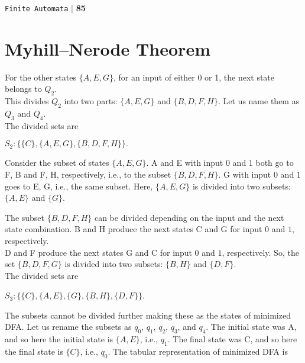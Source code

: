\documentclass[8pt]{beamer}
\begin{document}
\begin{frame}

\begin{flushright}
 \texttt{Finite Automata} \hspace*{0.10cm}\textbf{$|$} \textbf{85}\hspace*{0.5cm}
\end{flushright}

\section*{Myhill–Nerode Theorem}

\vspace*{0.5cm}
For the other states $\{A, E, G\}$, for an input of either 0 or 1, the next state belongs to $Q_2$.\\
This divides $Q_2$ into two parts: $\{A, E, G\}$ and $\{B, D, F, H\}$. Let us name them as $Q_3$ and $Q_4$.\\
The divided sets are\\

\vspace*{0.3cm}
\pause
\begin{center}
  $S_2: \{\{C\}, \{A, E, G\}, \{B, D, F, H\}\}.$ \\
\end{center}

\pause
Consider the subset of states $\{A, E, G\}$. A and E with input 0 and 1 both go to F, B and F, H, respectively,
i.e., to the subset $\{B, D, F, H\}$. G with input $0$ and $1$ goes to E, G, i.e., the same subset. Here, $\{A, E, G\}$
is divided into two subsets: $\{A, E\}$ and $\{G\}$.\\
\end{frame}

\begin{frame}
\hspace*{0.4cm} The subset $\{B, D, F, H\}$ can be divided depending on the input and the next state combination. B and
H produce the next states C and G for input $0$ and $1$, respectively.\\
\hspace*{0.4cm} D and F produce the next states G and C for input $0$ and $1$, respectively. So, the set $\{B, D, F, G\}$ is
divided into two subsets: $\{B, H\}$ and $\{D, F\}$.\\
\hspace*{0.4cm} The divided sets are\\

\vspace*{0.3cm}
\pause
\begin{center}
  $S_3: \{\{C\}, \{A, E\}, \{G\}, \{B, H\}, \{D, F\}\} $. \\
\end{center}

\pause
The subsets cannot be divided further making these as the states of minimized DFA. Let us rename the
subsets as $q_0$, $q_1$, $q_2$, $q_3$, and $q_4$. The initial state was A, and so here the initial state is $\{A, E\}$, i.e., $q_1$. The
final state was C, and so here the final state is $\{C\}$, i.e., $q_0$. The tabular representation of minimized DFA is\\
\end{frame}
\end{document}
